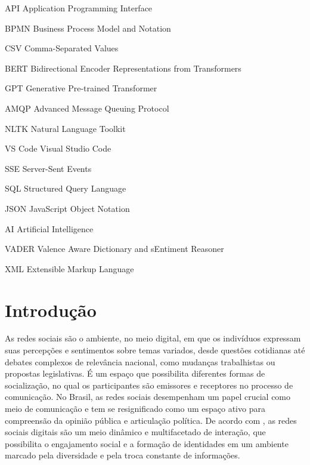 \documentclass[
	12pt,				%
	oneside,			%
	a4paper,			%
	english,			%
	french,				%
	spanish,			%
	brazil				%
	]{abntex2}
\begin{document}
\begin{siglas}
  \item[API] Application Programming Interface
  \item[BPMN] Business Process Model and Notation
  \item[CSV] Comma-Separated Values
  \item[BERT] Bidirectional Encoder Representations from Transformers
  \item[GPT] Generative Pre-trained Transformer
  \item[AMQP] Advanced Message Queuing Protocol
  \item[NLTK] Natural Language Toolkit
  \item[VS Code] Visual Studio Code
  \item[SSE] Server-Sent Events
  \item[SQL] Structured Query Language
  \item[JSON] JavaScript Object Notation
  \item[AI] Artificial Intelligence
  \item[VADER] Valence Aware Dictionary and sEntiment Reasoner
  \item[XML] Extensible Markup Language
\end{siglas}

\tableofcontents*
\cleardoublepage


\textual
\pagestyle{simple}                  %


\hypertarget{introduuxe7uxe3o}{%
\chapter{Introdução}\label{introduuxe7uxe3o}}

As redes sociais são o ambiente, no meio digital, em que os indivíduos
expressam suas percepções e sentimentos sobre temas variados, desde
questões cotidianas até debates complexos de relevância nacional, como
mudanças trabalhistas ou propostas legislativas. É um espaço que
possibilita diferentes formas de socialização, no qual os participantes
são emissores e receptores no processo de comunicação. No Brasil, as
redes sociais desempenham um papel crucial como meio de comunicação e
tem se resignificado como um espaço ativo para compreensão da opinião
pública e articulação política. De acordo com
, as redes sociais digitais são um meio
dinâmico e multifacetado de interação, que possibilita o engajamento
social e a formação de identidades em um ambiente marcado pela
diversidade e pela troca constante de informações.
\end{document}
